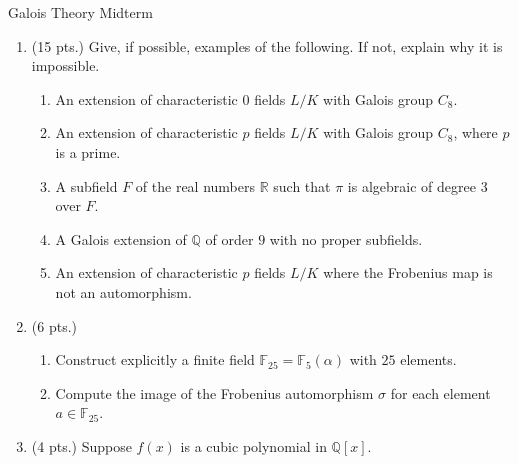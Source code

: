 \documentclass[11pt]{report}
\newcommand\QQ{\mathbb Q}
\newcommand\R{\mathbb R}
\newcommand\F{\mathbb F}
\begin{document}

\begin{center}
{\sc Galois Theory Midterm

}

\end{center}

\bigskip

%

\begin{enumerate}

\item (15 pts.) Give, if possible, examples of the following.  If not, explain why it is impossible.

\begin{enumerate}

\item An extension of characteristic $0$ fields $L/K$ with Galois group $C_8$.

\item An extension of characteristic $p$ fields $L/K$ with Galois group $C_8$, where $p$ is a prime.

\item A subfield $F$ of the real numbers $\R$ such that $\pi$ is algebraic of degree $3$ over $F$.

\item A Galois extension of $\QQ$ of order $9$ with no proper subfields.

\item An extension of characteristic $p$ fields $L/K$ where the Frobenius map is not an automorphism.
 
\end{enumerate}

\item (6 pts.)

\begin{enumerate}

\item Construct explicitly a finite field $\F_{25} = \F_5(\alpha)$ with $25$ elements.

\item Compute the image of the Frobenius automorphism $\sigma$ for each element
$a \in \F_{25}$.

\end{enumerate}

\item (4 pts.) Suppose $f(x)$ is a cubic polynomial in $\QQ[x]$.

\begin{enumerate}


\end{enumerate}
\end{enumerate}
\end{document}
